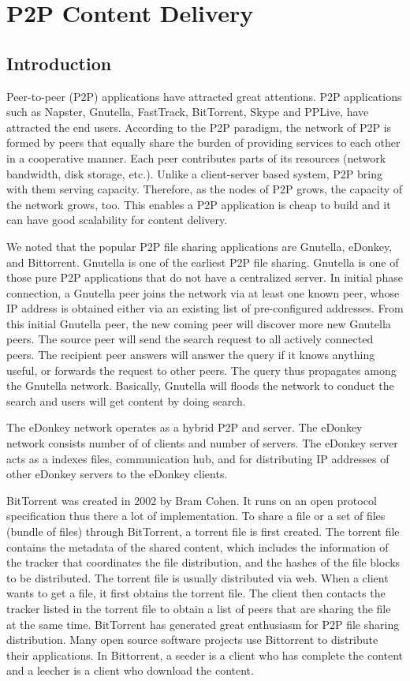 \chapter{P2P Content Delivery}
\section{Introduction}

Peer-to-peer (P2P) applications have attracted great attentions.
P2P applications such as Napster, Gnutella, FastTrack, BitTorrent, Skype and PPLive, have attracted the end users.
According to the P2P paradigm, the network of P2P is formed by peers that equally share the burden of providing services to each other in a cooperative manner.
Each peer contributes parts of its resources (network bandwidth, disk storage, etc.).
Unlike a client-server based system, P2P bring with them serving capacity. 
Therefore, as the nodes of P2P grows, the capacity of the network grows, too. 
This enables a P2P application is cheap to build and it can have good scalability for content delivery.  

We noted that the popular P2P file sharing applications are Gnutella, eDonkey, and Bittorrent.  
Gnutella is one of the earliest P2P file sharing.
Gnutella is one of those pure P2P applications that do not have a centralized server.
In initial phase connection, a Gnutella peer joins the network via at least one known peer, whose IP address is obtained either via an existing list of pre-configured addresses.
From this initial Gnutella peer, the new coming peer will discover more new Gnutella peers.
The source peer will send the search request to all actively connected peers. 
The recipient peer answers will answer the query if it knows anything useful, or forwards the request to other peers.
The query thus propagates among the Gnutella network.
Basically, Gnutella will floods the network to conduct the search and users will get content by doing search.

The eDonkey network operates as a hybrid P2P and server. 
The eDonkey network consists number of of clients and number of servers. 
The eDonkey server acts as a indexes files, communication hub, and for distributing IP addresses of other eDonkey servers to the eDonkey clients.

BitTorrent was created in 2002 by Bram Cohen. 
It runs on an open protocol specification thus there a lot of implementation.
To share a file or a set of files (bundle of files) through BitTorrent, a torrent file is first created. 
The torrent file contains the metadata of the shared content, which includes the information of the tracker that coordinates the file distribution, and the hashes of the file blocks to be distributed. 
The torrent file is usually distributed via web.
When a client wants to get a file, it first obtains the torrent file. 
The client then contacts the tracker listed in the torrent file to obtain a list of peers that are sharing the file at the same time.  
BitTorrent has generated great enthusiasm for P2P file sharing distribution.  
Many open source software projects use Bittorrent to distribute their applications.
In Bittorrent, a seeder is a client who has complete the content and a leecher is a client who download the content.

